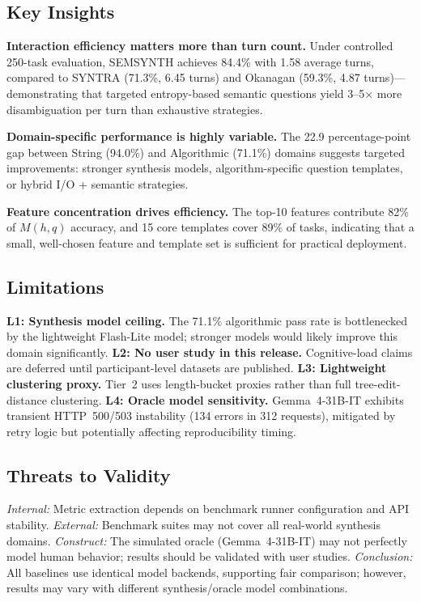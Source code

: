 \documentclass[10pt,conference]{IEEEtran}
\begin{document}
\subsection{Key Insights}
\textbf{Interaction efficiency matters more than turn count.} Under controlled 250-task evaluation, SEMSYNTH achieves 84.4\% with 1.58 average turns, compared to SYNTRA (71.3\%, 6.45 turns) and Okanagan (59.3\%, 4.87 turns)---demonstrating that targeted entropy-based semantic questions yield 3--5$\times$ more disambiguation per turn than exhaustive strategies.

\textbf{Domain-specific performance is highly variable.} The 22.9 percentage-point gap between String (94.0\%) and Algorithmic (71.1\%) domains suggests targeted improvements: stronger synthesis models, algorithm-specific question templates, or hybrid I/O + semantic strategies.

\textbf{Feature concentration drives efficiency.} The top-10 features contribute 82\% of $M(h,q)$ accuracy, and 15 core templates cover 89\% of tasks, indicating that a small, well-chosen feature and template set is sufficient for practical deployment.

\subsection{Limitations}
\textbf{L1: Synthesis model ceiling.} The 71.1\% algorithmic pass rate is bottlenecked by the lightweight Flash-Lite model; stronger models would likely improve this domain significantly.
\textbf{L2: No user study in this release.} Cognitive-load claims are deferred until participant-level datasets are published.
\textbf{L3: Lightweight clustering proxy.} Tier~2 uses length-bucket proxies rather than full tree-edit-distance clustering.
\textbf{L4: Oracle model sensitivity.} Gemma~4-31B-IT exhibits transient HTTP~500/503 instability (134 errors in 312 requests), mitigated by retry logic but potentially affecting reproducibility timing.

\subsection{Threats to Validity}
\textit{Internal:} Metric extraction depends on benchmark runner configuration and API stability. \textit{External:} Benchmark suites may not cover all real-world synthesis domains. \textit{Construct:} The simulated oracle (Gemma~4-31B-IT) may not perfectly model human behavior; results should be validated with user studies. \textit{Conclusion:} All baselines use identical model backends, supporting fair comparison; however, results may vary with different synthesis/oracle model combinations.
\end{document}
